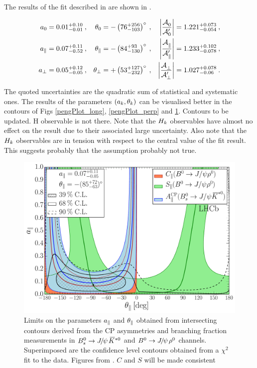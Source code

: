The results of the \chisq fit described in  are shown in .

\begin{subequations}
\label{peng_a_theta_results}
\begin{align}
    a_{0}         & = 0.01^{+0.10}_{-0.01}\:, & \theta_{0}         & = -\left( 76^{+256}_{-103} \right)^\circ\:, &  \left| \frac{\mathcal{A}_{0}^{} }{\mathcal{A}_{0}^{\prime}} \right|          = 1.221^{+0.073}_{-0.054}\:,\\
    a_{\parallel} & = 0.07^{+0.11}_{-0.52}\:, & \theta_{\parallel} & = -\left( 84^{+93}_{-130} \right)^\circ\:,  &  \left| \frac{\mathcal{A}_{\parallel}^{} }{\mathcal{A}_{\parallel}^{\prime}} \right|  = 1.233^{+0.102}_{-0.078}\:,\\
    a_{\perp}     & = 0.05^{+0.12}_{-0.05}\:, & \theta_{\perp}     & = +\left( 53^{+127}_{-232} \right)^\circ\:, &  \left| \frac{\mathcal{A}_{\perp}^{} }{\mathcal{A}_{\perp}^{\prime}} \right|      = 1.027^{+0.078}_{-0.06}\:.
\end{align}
\end{subequations}

\noindent The quoted uncertainties are the quadratic sum of statistical and systematic ones.
The results of the parameters $(a_k,\theta_k)$ can be visualised better in the contours of
Figs \ref{pengPlot_long}, \ref{pengPlot_perp} and \ref{pengPlot_para}. {\color{red} Contours to be updated. H observable is not there.} Note that the $H_{k}$
observables have almost no effect on the result due to their associated large uncertainty.
Also note that the $H_{k}$ observables are in tension with respect to the central value of
the fit result. This suggests probably that the assumption  probably
not true.

\begin{figure}[t]
\centering
  \includegraphics[trim=0.0cm 0.0cm 0.0cm 0.0cm, clip=true,scale=0.33]{Figures/Chapter5/Penguin_Contribution_Ang_vs_Abs_allB2VV_Para.pdf}
  \caption{Limits on the parameters $a_{\parallel}$ and $\theta_{\parallel}$ obtained from intersecting contours derived from
           the CP asymmetries and branching fraction measurements in $\BsJpsiKst$ and $\BdJpsiRho$ channels.  Superimposed are the confidence
           level contours obtained from a $\chi^2$ fit to the data. Figures from \cite{DeBruyn-thesis}. {\color{red} $C$ and $S$ will be made consistent}}
  \label{pengPlot_para}
\end{figure}

